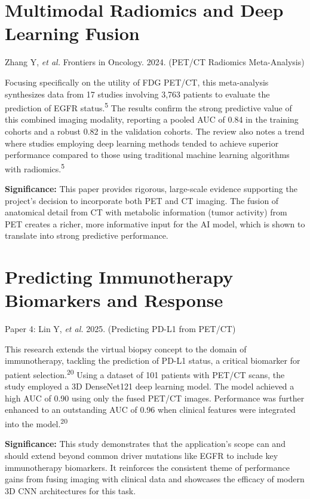 \documentclass{article}
\begin{document}
\section*{Multimodal Radiomics and Deep Learning Fusion}

Zhang Y, \textit{et al.} Frontiers in Oncology. 2024. (PET/CT Radiomics Meta-Analysis)

\vspace{1em} %

Focusing specifically on the utility of FDG PET/CT, this meta-analysis synthesizes data from 17 studies involving 3,763 patients to evaluate the prediction of EGFR status.\textsuperscript{5} The results confirm the strong predictive value of this combined imaging modality, reporting a pooled AUC of 0.84 in the training cohorts and a robust 0.82 in the validation cohorts. The review also notes a trend where studies employing deep learning methods tended to achieve superior performance compared to those using traditional machine learning algorithms with radiomics.\textsuperscript{5}

\vspace{1em}

\textbf{Significance:} This paper provides rigorous, large-scale evidence supporting the project's decision to incorporate both PET and CT imaging. The fusion of anatomical detail from CT with metabolic information (tumor activity) from PET creates a richer, more informative input for the AI model, which is shown to translate into strong predictive performance.

\section*{Predicting Immunotherapy Biomarkers and Response}

Paper 4: Lin Y, \textit{et al.} 2025. (Predicting PD-L1 from PET/CT)

\vspace{1em}

This research extends the virtual biopsy concept to the domain of immunotherapy, tackling the prediction of PD-L1 status, a critical biomarker for patient selection.\textsuperscript{20} Using a dataset of 101 patients with PET/CT scans, the study employed a 3D DenseNet121 deep learning model. The model achieved a high AUC of 0.90 using only the fused PET/CT images. Performance was further enhanced to an outstanding AUC of 0.96 when clinical features were integrated into the model.\textsuperscript{20}

\vspace{1em}

\textbf{Significance:} This study demonstrates that the application's scope can and should extend beyond common driver mutations like EGFR to include key immunotherapy biomarkers. It reinforces the consistent theme of performance gains from fusing imaging with clinical data and showcases the efficacy of modern 3D CNN architectures for this task.
\end{document}

